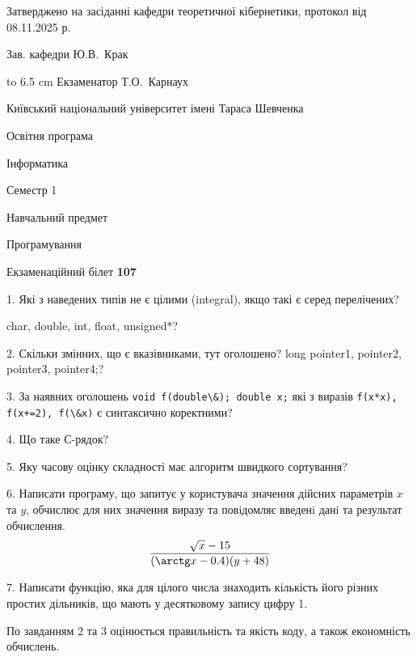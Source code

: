 \documentclass[12pt, ukrainian]{article}
\def\code#1{\Verb!#1!}
\begin{document}
{\smallskip\smallskip \begin {scriptsize} Затверджено на засіданні кафедри теоретичної кібернетики, протокол   від   08.11.2025 р.\par\smallskip\smallskip\smallskip\smallskip
{\parbox {6.5 cm} {Зав. кафедри \dotfill Ю.В.~Крак}}\hspace {0.7cm} {\hbox to 6.5 cm { Екзаменатор \dotfill Т.О.~Карнаух}} \end{scriptsize}}
\newpage
{{\begin {scriptsize}\par
{ \center  Київський національний університет імені Тараса Шевченка \par}
{\parbox {5 cm}{Освітня програма \hfill}{\parbox {7 cm}{Інформатика\hfill}}\parbox {6 cm}{\hfill Семестр 1}}\par
{\parbox {5 cm} {Навчальний предмет \hfill}\parbox {7 cm}{Програмування \hfill}\parbox {6cm}{\hfill}\par}\vspace{-15pt} \end{scriptsize}}{\center Екзаменаційний білет \No \textbf { 107 }\par}}
{%
1. Які з наведених типів не є цілими (integral), якщо такі є серед перелічених?

char, double, int, float, unsigned*?
\par
\vspace{2mm}
2. Скільки змінних, що є вказівниками, тут оголошено?
long pointer1, pointer2, pointer3, pointer4;?
\par
\vspace{2mm}
3. За наявних оголошень \code{void f(double\&); double x;} які з виразів \code{f(x*x), f(x+=2), f(\&x)} є синтаксично коректними?
\par
\vspace{2mm}
4. Що таке С-рядок?
\par
\vspace{2mm}
5. Яку часову оцінку складності має алгоритм швидкого сортування?
\par
\vspace{2mm}
6. Написати програму, що запитує у користувача значення дійсних параметрів $x$ та $y$, обчислює для них значення виразу та повiдомляє введенi данi та результат обчислення.
$$\frac{\sqrt x - 15}{(\arctg x - 0.4) (y + 48)}$$ 

\par
7. Написати функцію, яка для цілого числа знаходить кількість його різних простих дільників, що мають у десятковому запису цифру 1.

По завданням 2 та 3 оцінюється правильність та якість коду, а також економність обчислень.

}
\end{document}
